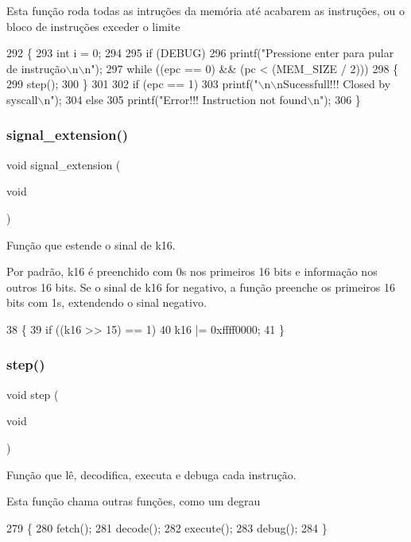 Esta função roda todas as intruções da memória até acabarem as instruções, ou o bloco de instruções exceder o limite 
\begin{DoxyCode}
292 \{
293     \textcolor{keywordtype}{int} i = 0;
294 
295     \textcolor{keywordflow}{if} (DEBUG)
296         printf(\textcolor{stringliteral}{"Pressione enter para pular de instrução\(\backslash\)n\(\backslash\)n"});
297     \textcolor{keywordflow}{while} ((epc == 0) && (pc < (MEM_SIZE / 2)))
298     \{
299         step();
300     \}
301 
302     \textcolor{keywordflow}{if} (epc == 1)
303         printf(\textcolor{stringliteral}{"\(\backslash\)n\(\backslash\)nSucessfull!!! Closed by syscall\(\backslash\)n"});
304     \textcolor{keywordflow}{else}
305         printf(\textcolor{stringliteral}{"Error!!! Instruction not found\(\backslash\)n"});
306 \}
\end{DoxyCode}
\mbox{\label{recorder_8c_a19d0bbfdb5f0b372b4d230b601aaebd6}} 
\subsubsection{signal\+\_\+extension()}
{\footnotesize\ttfamily void signal\+\_\+extension (\begin{DoxyParamCaption}\item[{void}]{ }\end{DoxyParamCaption})}



Função que estende o sinal de k16. 

Por padrão, k16 é preenchido com 0\textquotesingle{}s nos primeiros 16 bits e informação nos outros 16 bits. Se o sinal de k16 for negativo, a função preenche os primeiros 16 bits com 1\textquotesingle{}s, extendendo o sinal negativo. 
\begin{DoxyCode}
38 \{
39     \textcolor{keywordflow}{if} ((k16 >> 15) == 1)
40         k16 |= 0xffff0000;
41 \}
\end{DoxyCode}
\mbox{\label{recorder_8c_a9f1dffc0dde87c0cc5eea9fc77d89b28}} 
\subsubsection{step()}
{\footnotesize\ttfamily void step (\begin{DoxyParamCaption}\item[{void}]{ }\end{DoxyParamCaption})}



Função que lê, decodifica, executa e debuga cada instrução. 

Esta função chama outras funções, como um degrau 
\begin{DoxyCode}
279 \{
280     fetch();
281     decode();
282     execute();
283     debug();
284 \}
\end{DoxyCode}
